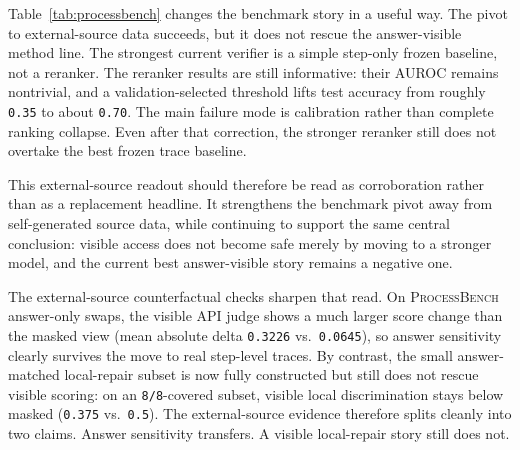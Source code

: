 Table~\ref{tab:processbench} changes the benchmark story in a useful way. The
pivot to external-source data succeeds, but it does not rescue the
answer-visible method line. The strongest current verifier is a simple
step-only frozen baseline, not a reranker. The reranker results are still
informative: their AUROC remains nontrivial, and a validation-selected
threshold lifts test accuracy from roughly \texttt{0.35} to about
\texttt{0.70}. The main failure mode is calibration rather than complete
ranking collapse. Even after that correction, the stronger reranker still does
not overtake the best frozen trace baseline.

This external-source readout should therefore be read as corroboration rather
than as a replacement headline. It strengthens the benchmark pivot away from
self-generated source data, while continuing to support the same central
conclusion: visible access does not become safe merely by moving to a stronger
model, and the current best answer-visible story remains a negative one.

The external-source counterfactual checks sharpen that read. On
\textsc{ProcessBench} answer-only swaps, the visible API judge shows a much
larger score change than the masked view (mean absolute delta
\texttt{0.3226} vs.\ \texttt{0.0645}), so answer sensitivity clearly survives
the move to real step-level traces. By contrast, the small answer-matched
local-repair subset is now fully constructed but still does not rescue visible
scoring: on an \texttt{8/8}-covered subset, visible local discrimination stays
below masked (\texttt{0.375} vs.\ \texttt{0.5}). The external-source evidence
therefore splits cleanly into two claims. Answer sensitivity transfers. A
visible local-repair story still does not.
